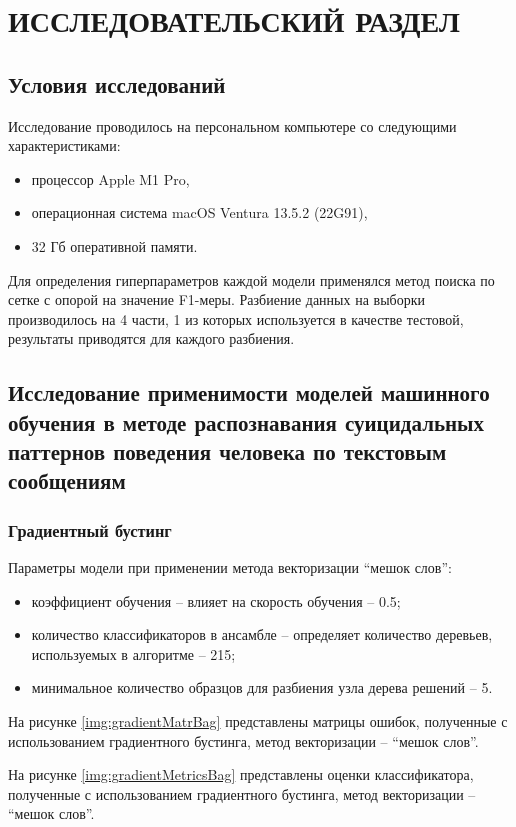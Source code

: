 \section{ИССЛЕДОВАТЕЛЬСКИЙ РАЗДЕЛ}
\subsection{Условия исследований}
Исследование проводилось на персональном компьютере со следующими характеристиками:

\begin{itemize}
\item процессор Apple M1 Pro,
\item операционная система macOS Ventura 13.5.2 (22G91),
\item 32 Гб оперативной памяти.
\end{itemize}

Для определения гиперпараметров каждой модели применялся метод поиска по сетке с опорой на значение F1-меры. Разбиение данных на выборки производилось на 4 части, 1 из которых используется в качестве тестовой, результаты приводятся для каждого разбиения.

\subsection{Исследование применимости моделей машинного обучения в методе распознавания суицидальных паттернов поведения человека по текстовым сообщениям}

\subsubsection{Градиентный бустинг}

Параметры модели при применении метода векторизации ``мешок слов'':
\begin{itemize}
	\item коэффициент обучения -- влияет на скорость обучения -- 0.5;
	\item количество классификаторов в ансамбле -- определяет количество деревьев, используемых в алгоритме -- 215;
	\item минимальное количество образцов для разбиения узла дерева решений -- 5.
\end{itemize}

На рисунке \ref{img:gradientMatrBag} представлены матрицы ошибок, полученные с использованием градиентного бустинга, метод векторизации -- ``мешок слов''.

На рисунке \ref{img:gradientMetricsBag} представлены оценки классификатора, полученные с использованием градиентного бустинга, метод векторизации -- ``мешок слов''.

